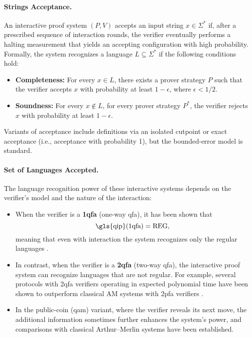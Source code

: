 \paragraph{Strings Acceptance.}
An interactive proof system $(P,V)$ accepts an input string $x\in\Sigma^*$ if, after a prescribed sequence of interaction rounds, the verifier eventually performs a halting measurement that yields an accepting configuration with high probability. Formally, the system recognizes a language $L\subseteq\Sigma^*$ if the following conditions hold:
\begin{itemize}
  \item \textbf{Completeness:} For every $x\in L$, there exists a prover strategy $P$ such that the verifier accepts $x$ with probability at least $1-\epsilon$, where $\epsilon<1/2$.
  \item \textbf{Soundness:} For every $x\notin L$, for every prover strategy $P^*$, the verifier rejects $x$ with probability at least $1-\epsilon$.
\end{itemize}
Variants of acceptance include definitions via an isolated cutpoint or exact acceptance (i.e., acceptance with probability 1), but the bounded-error model is standard.

\paragraph{Set of Languages Accepted.}
The language recognition power of these interactive systems depends on the verifier’s model and the nature of the interaction:
\begin{itemize}
  \item When the verifier is a \textbf{1qfa} (one-way qfa), it has been shown that
  \[
  \text{\gls{qip}(1qfa)} = \text{REG},
  \]
  meaning that even with interaction the system recognizes only the regular languages \cite{nishimura2009application}.
  \item In contrast, when the verifier is a \textbf{2qfa} (two-way qfa), the interactive proof system can recognize languages that are not regular. For example, several protocols with 2qfa verifiers operating in expected polynomial time have been shown to outperform classical AM systems with 2pfa verifiers \cite{zheng2015power, nishimura2015interactive}.
  \item In the public-coin (\gls{qam}) variant, where the verifier reveals its next move, the additional information sometimes further enhances the system’s power, and comparisons with classical Arthur–Merlin systems have been established.
\end{itemize}

